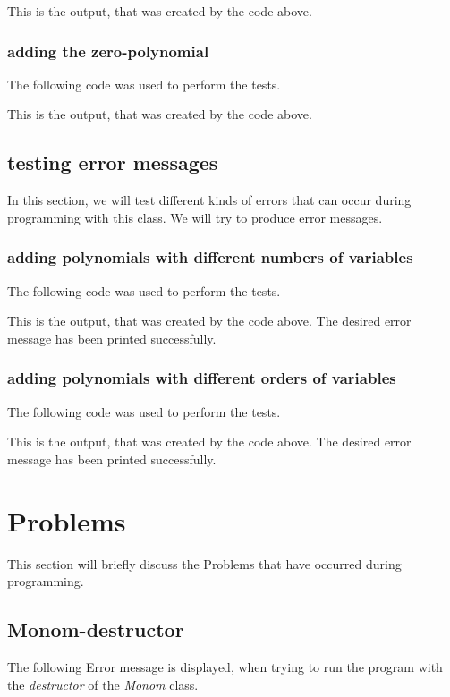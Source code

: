 \documentclass[11pt,titlepage]{article}
\begin{document}
		This is the output, that was created by the code above.
			
\newpage			
		\subsubsection{adding the zero-polynomial}
		The following code was used to perform the tests.
			
		
		This is the output, that was created by the code above.
			
			
\newpage		
	\subsection{testing error messages}
	In this section, we will test different kinds of errors that can occur during programming with this class.
	We will try to produce error messages.
	
		\subsubsection{adding polynomials with different numbers of variables}
		The following code was used to perform the tests.
			
		
		This is the output, that was created by the code above. The desired error message has been printed successfully.
			
			
		\subsubsection{adding polynomials with different orders of variables}
		The following code was used to perform the tests.
			
		
		This is the output, that was created by the code above. The desired error message has been printed successfully.
			
\newpage

		
	\section{Problems}
	This section will briefly discuss the Problems that have occurred during programming.
		\subsection{Monom-destructor}
		The following Error message is displayed, when trying to run the program with the \emph{destructor} of the \emph{Monom} class.
		
\end{document}

